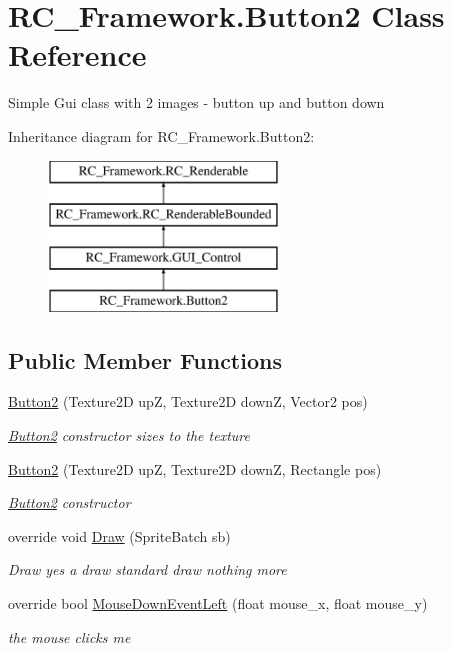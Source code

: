 \hypertarget{class_r_c___framework_1_1_button2}{}\section{R\+C\+\_\+\+Framework.\+Button2 Class Reference}
\label{class_r_c___framework_1_1_button2}


Simple Gui class with 2 images -\/ button up and button down  


Inheritance diagram for R\+C\+\_\+\+Framework.\+Button2\+:\begin{figure}[H]
\begin{center}
\leavevmode
\includegraphics[height=4.000000cm]{class_r_c___framework_1_1_button2}
\end{center}
\end{figure}
\subsection*{Public Member Functions}
\begin{DoxyCompactItemize}
\item 
\mbox{\hyperlink{class_r_c___framework_1_1_button2_a59ba03059eb46cc321f6b38a0f5825ba}{Button2}} (Texture2D upZ, Texture2D downZ, Vector2 pos)
\begin{DoxyCompactList}\small\item\em \mbox{\hyperlink{class_r_c___framework_1_1_button2}{Button2}} constructor sizes to the texture \end{DoxyCompactList}\item 
\mbox{\hyperlink{class_r_c___framework_1_1_button2_a82157ea5fe77051daa5f1d6dae13566e}{Button2}} (Texture2D upZ, Texture2D downZ, Rectangle pos)
\begin{DoxyCompactList}\small\item\em \mbox{\hyperlink{class_r_c___framework_1_1_button2}{Button2}} constructor \end{DoxyCompactList}\item 
override void \mbox{\hyperlink{class_r_c___framework_1_1_button2_addc2770e16ca29d6bad27e7b234dddf3}{Draw}} (Sprite\+Batch sb)
\begin{DoxyCompactList}\small\item\em Draw yes a draw standard draw nothing more \end{DoxyCompactList}\item 
override bool \mbox{\hyperlink{class_r_c___framework_1_1_button2_ac15728fbc9e908a70990c159ecd5824f}{Mouse\+Down\+Event\+Left}} (float mouse\+\_\+x, float mouse\+\_\+y)
\begin{DoxyCompactList}\small\item\em the mouse clicks me \end{DoxyCompactList}\end{DoxyCompactItemize}
